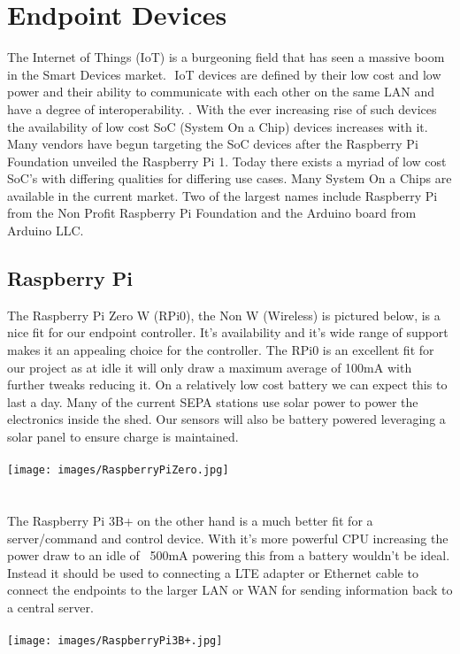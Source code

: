 

\section{Endpoint Devices}

The Internet of Things (IoT) is a burgeoning field that has seen a massive boom in the Smart Devices market. \citep{Lueth2018}⁠ IoT devices are defined by their low cost and low power and their ability to communicate with each other on the same LAN and have a degree of interoperability. \citep{Vujovic2014}⁠. With the ever increasing rise of such devices the availability of low cost SoC (System On a Chip) devices increases with it. Many vendors have begun targeting the SoC devices after the Raspberry Pi Foundation unveiled the Raspberry Pi 1. Today there exists a myriad of low cost SoC’s with differing qualities for differing use cases. \citep{Larabel2018} Many System On a Chips are available in the current market. Two of the largest names include Raspberry Pi from the Non Profit Raspberry Pi Foundation and the Arduino board from Arduino LLC. 

\subsection{Raspberry Pi}
The Raspberry Pi Zero W (RPi0), the Non W (Wireless) is pictured below, is a nice fit for our endpoint controller.  It’s availability and it’s wide range of support makes it an appealing choice for the controller. The RPi0 is an excellent fit for our project as at idle it will only draw a maximum average of 100mA \citep{Alex2017} with further tweaks reducing it. On a relatively low cost battery we can expect this to last a day. Many of the current SEPA stations use solar power to power the electronics inside the shed. \citep{SEPA2007} Our sensors will also be battery powered leveraging a solar panel to ensure charge is maintained.
\\\\
\texttt{[image: images/RaspberryPiZero.jpg]}\\\cite{Amos2016}
\\\\
The Raspberry Pi 3B+ on the other hand is a much better fit for a server/command and control device. \citep{Leccese2014} With it's more powerful CPU increasing the power draw to an idle of ~500mA \citep{RaspberryPiFoundation2018} powering this from a battery wouldn't be ideal. Instead it should be used to connecting a LTE adapter or Ethernet cable to connect the endpoints to the larger LAN or WAN for sending information back to a central server.
\\\\
\texttt{[image: images/RaspberryPi3B+.jpg]}\\\citep{RaspberryPiFoundation2018a}
\\
